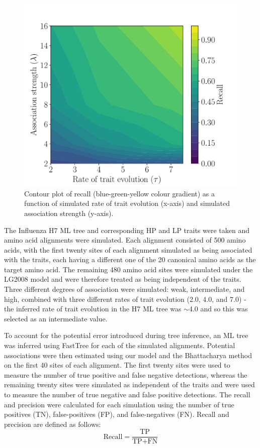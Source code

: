 \documentclass[]{article}
\begin{document}
\begin{figure}[h!]
	\centering
	\includegraphics[width=0.7\columnwidth]{benchmarks_contour.pdf}
	\caption{Contour plot of recall (blue-green-yellow colour gradient) as a function of simulated rate of trait evolution (x-axis) and simulated association strength (y-axis).}
	\label{fig:benchmarks}%
\end{figure}
The Influenza H7 ML tree and corresponding HP and LP traits were taken and amino acid alignments were simulated. Each alignment consisted of 500 amino acids, with the first twenty sites of each alignment simulated as being associated with the traits, each having a different one of the 20 canonical amino acids as the target amino acid. The remaining 480 amino acid sites were simulated under the LG2008 model and were therefore treated as being independent of the traits. Three different degrees of association were simulated: weak, intermediate, and high, combined with three different rates of trait evolution (2.0, 4.0, and 7.0) - the inferred rate of trait evolution in the H7 ML tree was $\sim$4.0 and so this was selected as an intermediate value. 

To account for the potential error introduced during tree inference, an ML tree was inferred using FastTree \citep{price2010fasttree}  for each of the simulated alignments. Potential associations were then estimated using our model and the Bhattacharya method \citep{bhattacharya2007founder} on the first 40 sites of each alignment. The first twenty sites were used to measure the number of true positive and false negative detections, whereas the remaining twenty sites were simulated as independent of the traits and were used to measure the number of true negative and false positive detections. The recall and precision were calculated for each simulation using the number of true positives (TN), false-positives (FP), and false-negatives (FN).  Recall and precision are defined as follows:
\begin{equation}
\text{Recall}=\frac{\text{TP}}{\text{TP}+\text{FN}}
\end{equation}
\end{document}
